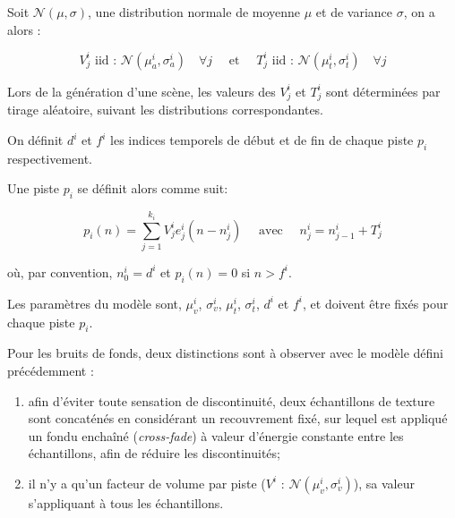   Soit $\mathcal{N}(\mu,\sigma)$, une distribution normale de moyenne $\mu$ et de variance $\sigma$, on a alors :

  \begin{equation}
    \label{eq:ch4_eq1}
    V_j^i \textrm{ iid : } \mathcal{N}(\mu_a^{i},\sigma_a^{i}) \quad \forall j \quad \textrm{ et } \quad T_j^i \textrm{ iid : } \mathcal{N}({\mu_t^{i},\sigma_t^{i}}) \quad \forall j
  \end{equation}

  Lors de la génération d'une scène, les valeurs des $V^i_j$ et $T_j^i$ sont déterminées par tirage aléatoire, suivant les distributions correspondantes.

  On définit $d^i$ et $f^i$ les indices temporels de début et de fin de chaque piste $p_i$ respectivement.

  Une piste $p_i$ se définit alors comme suit:

  \begin{equation}
    \label{eq:ch4_eq2}
    p_{i}(n)= \sum_{j=1}^{k_i} V_j^i e_j^i(n-n_j^i) \quad \textrm{ avec } \quad n_j^i=n_{j-1}^i + T_j^i
  \end{equation}

  où, par convention, $n^i_0=d^i$ et $p_i(n)=0$ si $n>f^i$.

  Les paramètres du modèle sont, $\mu_v^i$, $\sigma_v^i$, $\mu_t^i$, $\sigma_t^i$, $d^i$ et $f^i$, et doivent être fixés pour chaque piste $p_i$. %

  Pour les bruits de fonds, deux distinctions sont à observer avec le modèle défini précédemment :

  \begin{enumerate}
    \item afin d'éviter toute sensation de discontinuité, deux échantillons de texture sont concaténés en considérant un recouvrement fixé, sur lequel est appliqué un fondu enchaîné (\emph{cross-fade}) à valeur d'énergie constante entre les échantillons, afin de réduire les discontinuités;
    \item il n'y a qu'un facteur de volume par piste ($V^i \textrm{ : } \mathcal{N}(\mu_v^{i},\sigma_v^{i})$), sa valeur s'appliquant à tous les échantillons.
  \end{enumerate}


